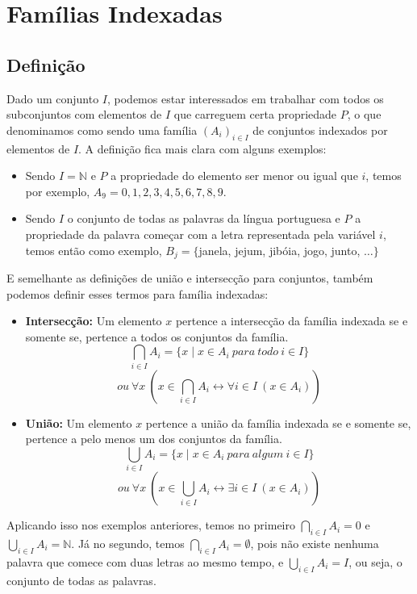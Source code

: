 \section{Famílias Indexadas}
\subsection{Definição}
Dado um conjunto $I$, podemos estar interessados em trabalhar com todos os subconjuntos com elementos de $I$ que carreguem certa propriedade $P$, o que denominamos como sendo uma família $(A_i)_{i\in I}$ de conjuntos indexados por elementos de $I$.
A definição fica mais clara com alguns exemplos:

\begin{itemize}
  \item Sendo $I=\mathbb{N}$ e $P$ a propriedade do elemento ser menor ou igual que $i$, temos por exemplo, $A_{9}={0,1,2,3,4,5,6,7,8,9}$.
  \item Sendo $I$ o conjunto de todas as palavras da língua portuguesa e $P$ a propriedade da palavra começar com a letra representada pela variável $i$, temos então como exemplo, $B_j=\{$janela, jejum, jibóia, jogo, junto, $\dots\}$
\end{itemize}

E semelhante as definições de união e intersecção para conjuntos, também podemos definir esses termos para família indexadas:

\begin{itemize}
  \item \textbf{Intersecção:} Um elemento $x$ pertence a intersecção da família indexada se e somente se, pertence a todos os conjuntos da família.
  \[\bigcap_{i\in I} A_i = \{x \mid x \in A_i\ para\ todo\ i\in I\}\]
  \[ou\ \forall x\ (x \in \bigcap_{i \in I} A_i \leftrightarrow \forall i \in I\ (x \in A_i))\]
  \item \textbf{União:} Um elemento $x$ pertence a união da família indexada se e somente se, pertence a pelo menos um dos conjuntos da família.
  \[\bigcup_{i\in I} A_i = \{x \mid x \in A_i\ para\ algum\ i\in I\}\]
  \[ou\ \forall x\ (x \in \bigcup_{i \in I} A_i \leftrightarrow \exists i \in I\ (x \in A_i))\]
\end{itemize}

Aplicando isso nos exemplos anteriores, temos no primeiro $\bigcap_{i \in I} A_i = {0}$ e $\bigcup_{i \in I} A_i = \mathbb{N}$. Já no segundo, temos $\bigcap_{i \in I} A_i = \emptyset$, pois não existe nenhuma palavra que comece com duas letras ao mesmo tempo, e $\bigcup_{i \in I} A_i = I$, ou seja, o conjunto de todas as palavras.

